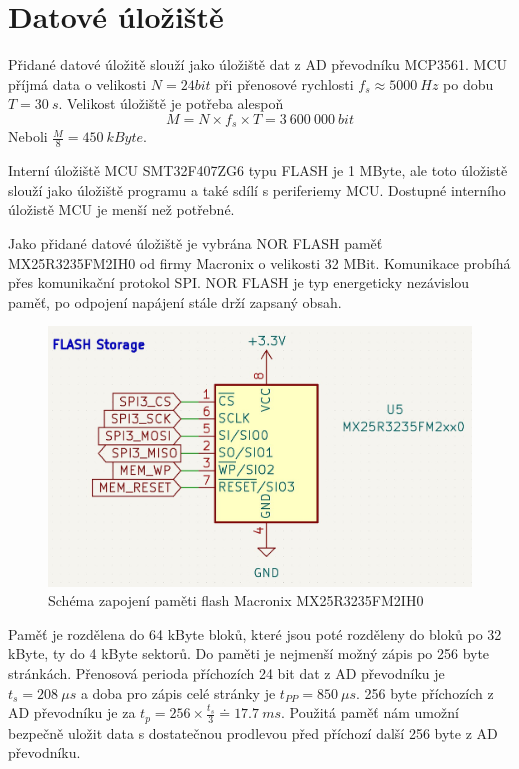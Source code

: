 \section{Datové úložiště}
Přidané datové úložitě slouží jako úložiště dat z AD převodníku MCP3561. MCU příjmá data o velikosti $N = 24 bit$ při přenosové rychlosti $f_s \approx 5000 \ Hz$ po dobu $T = 30 \ s$. Velikost úložiště je potřeba alespoň
\begin{equation*}
    M = N \times f_s \times T = 3 \ 600 \ 000 \ bit
\end{equation*}
Neboli $\frac{M}{8} = 450 \ kByte$.
\par
Interní úložiště MCU SMT32F407ZG6 typu FLASH je 1 MByte, ale toto úložistě slouží jako úložiště programu a také sdílí s periferiemy MCU. Dostupné interního úložistě MCU je menší než potřebné.
\par
Jako přidané datové úložiště je vybrána NOR FLASH paměť MX25R3235FM2IH0 od firmy Macronix o velikosti 32 MBit. Komunikace probíhá přes komunikační protokol SPI. NOR FLASH je typ energeticky nezávislou paměť, po odpojení napájení stále drží zapsaný obsah.
\begin{figure}[H]
    \label{fig:flash_memory}
    \caption{Schéma zapojení paměti flash Macronix MX25R3235FM2IH0}
    \includegraphics[width=1\textwidth]{pictures/flash_memory.jpg}
\end{figure}
Paměť je rozdělena do 64 kByte bloků, které jsou poté rozděleny do bloků po 32 kByte, ty do 4 kByte sektorů. Do paměti je nejmenší možný zápis po 256 byte stránkách. Přenosová perioda příchozích 24 bit dat z AD převodníku je $t_s = 208 \ \mu s$ a doba pro zápis celé stránky je $t_{PP} = 850 \ \mu s$. 256 byte příchozích z AD převodníku je za $t_p = 256 \times \frac{t_s}{3} \doteq 17.7 \ ms$.
Použitá paměť nám umožní bezpečně uložit data s dostatečnou prodlevou před příchozí další 256 byte z AD převodníku.


